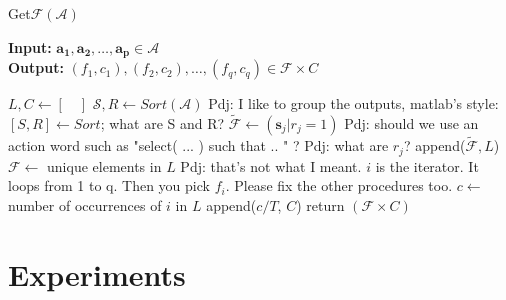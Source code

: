 \documentclass[conference]{IEEEtran}
\newcommand{\p}[1]{{\color{blue} Pdj: #1}}
\begin{document}
\begin{algorithm}
	\caption{ Get$\mathcal{F}$$(\mathcal{A})$ }
	\label{alg:f}
	\hspace*{\algorithmicindent} \textbf{Input: } $ \mathbf{a_1},\mathbf{a_2} ,\dots, \mathbf{a_p}\in \mathcal{A}$ \\
	\hspace*{\algorithmicindent} \textbf{Output: } $ (f_1,c_1), (f_2, c_2), \dots, (f_q,c_q) \in \mathcal{F} \times C  $
	\begin{algorithmic}[1] 
		\State $L, C \leftarrow [ \quad ]$ 
		\State $\mathcal{S}, R \leftarrow Sort(\mathcal{A})$
                \p{I like to group the outputs, matlab's style:  $[S,R] \leftarrow Sort$; what are S and R?}
		\State $\tilde{\mathcal{F}} \leftarrow (\mathbf{s}_j | r_j = 1 )$ 
                \p{should we use an action word such as "select( ... ) such that .. " ?}
                \p{what are $r_j$?}
		\State append($\tilde{\mathcal{F}}, L $)
		\EndFor
		\State $\mathcal{F} \leftarrow $ unique elements in $L$ 
                \p{that's not what I meant. $i$ is the iterator. It loops from 1 to q. Then you pick $f_i$. Please fix
                  the other procedures too.}
		\State $c \leftarrow$ number of occurrences of $i$ in $L$ 
		\State append($c/T$, $C$)
		\EndFor
		\State return $(\mathcal{F} \times C)$
              \end{algorithmic}
\end{algorithm}

\section{Experiments}
\label{sec:exp}
\end{document}
